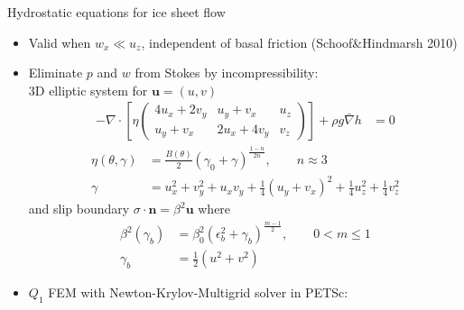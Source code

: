 \begin{frame}[shrink=5]{Hydrostatic equations for ice sheet flow}
  \begin{itemize}
  \item Valid when $w_x \ll u_z$, independent of basal friction {\small (Schoof\&Hindmarsh 2010)}
  \item Eliminate $p$ and $w$ from Stokes by incompressibility:\\
    \quad 3D elliptic system for $\bm u = (u,v)$
    \begin{align*}
      - \nabla\cdot \left[ \eta
        \begin{pmatrix}
          4 u_x + 2 v_y & u_y + v_x & u_z \\
          u_y + v_x & 2 u_x + 4 v_y & v_z
        \end{pmatrix} \right] + \rho g \bar\nabla h & = 0
    \end{align*}
    \begin{align*}
      \eta(\theta,\gamma) &= \frac{B(\theta)}{2} (\gamma_0 + \gamma)^{\frac{1-n}{2n}}, \qquad n \approx 3 \\
      \gamma &= u_x^2 + v_y^2 + u_xv_y + \frac 1 4 (u_y+v_x)^2 + \frac 1 4 u_z^2 + \frac 1 4 v_z^2
    \end{align*}
    and slip boundary $\sigma \cdot \bm n = \beta^2 \bm u$ where
    \begin{align*}
      \beta^2(\gamma_b) &= \beta_0^2 (\epsilon_b^2 + \gamma_b)^{\frac{m-1}{2}}, \qquad 0 < m \le 1 \\
      \gamma_b &= \frac 1 2 (u^2 + v^2)
    \end{align*}
  \item $Q_1$ FEM with Newton-Krylov-Multigrid solver in PETSc: 
  \end{itemize}
\end{frame}
